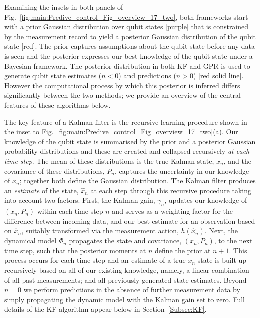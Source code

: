 Examining the insets in both panels of Fig.~\ref{fig:main:Predive_control_Fig_overview_17_two}, both frameworks start with a prior Gaussian distribution over qubit states [purple] that is constrained by the measurement record to yield a posterior Gaussian distribution of the qubit state [red]. The prior captures assumptions about the qubit state before any data is seen and the posterior expresses our best knowledge of the qubit state under a Bayesian framework.  The posterior distribution in both KF and GPR is used to generate qubit state estimates ($n<0$) and predictions ($n>0$) [red solid line].  However the computational process by which this posterior is inferred differs significantly between the two methods; we provide an overview of the central features of these algorithms below. 

The key feature of a Kalman filter is the recursive learning procedure shown in the inset to Fig.~\ref{fig:main:Predive_control_Fig_overview_17_two}(a). Our knowledge of the qubit state is summarised by the prior and a posterior Gaussian probability distributions and these are created and collapsed recursively \emph{at each time step}. The mean of these distributions is the true Kalman state, $x_n$, and the covariance of these distributions, $P_n$, captures the uncertainty in our knowledge of $x_n$; together both  define the Gaussian distribution. The Kalman filter produces an \emph{estimate} of the state, $\hat{x}_{n}$ at each step through this recursive procedure taking into account two factors. First, the Kalman gain, $\gamma_n$, updates our knowledge of $(x_n, P_n)$ within each time step $n$ and serves as a weighting factor for the difference between  incoming data, and our best estimate for an observation based on $\hat{x}_n$, suitably transformed via the measurement action, $h(\hat{x}_{n})$. Next, the dynamical model $\Phi_n$ propagates the state and covariance, $(x_n, P_n)$, to the next time step, such that the posterior moments at $n$ define the prior at $n+1$.  This process occurs for each time step and an estimate of a true $x_n$ state is built up recursively based on all of our existing knowledge, namely, a linear combination of all past measurements; and all previously generated state estimates.  Beyond $n=0$ we perform predictions in the absence of further measurement data by simply propagating the dynamic model with the Kalman gain set to zero.  Full details of the KF algorithm appear below in Section~\ref{Subsec:KF}.

